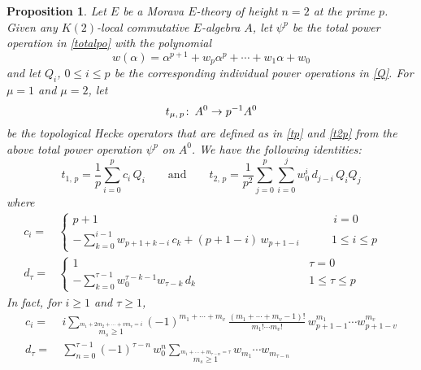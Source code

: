 \documentclass{gtpart}
\newtheorem{prop}[thm]{Proposition}
\theoremstyle{definition}
\theoremstyle{remark}
\def\co{\colon\thinspace}
\newcommand{\ad}{\text{and}}
\newcommand{\A}{\alpha}
\newcommand{\T}{\tau}
\renewcommand{\=}{\approx}
\renewcommand{\-}{\sim}
\numberwithin{equation}{section}
\numberwithin{thm}{section}
\begin{document}
\begin{prop}
 \label{prop:Q}
 Let $E$ be a Morava $E$-theory of height $n = 2$ at the prime $p$.  Given any 
 $K(2)$-local commutative $E$-algebra $A$, let $\psi^p$ be the total power 
 operation in \eqref{totalpo} with the polynomial 
 \begin{equation}
  \label{wi}
  w(\A) = \A^{p + 1} + w_p \A^p + \cdots + w_1 \A + w_0 
 \end{equation}
 and let $Q_i$, $0 \leq i \leq p$ be the corresponding individual power 
 operations in \eqref{Q}.  For $\mu = 1$ and $\mu = 2$, let 
 \[
  t_{\mu,\,p} \co A^0 \to p^{-1} A^0 
 \]
 be the topological Hecke operators that are defined as in \eqref{tp} and 
 \eqref{t2p} from the above total power operation $\psi^p$ on $A^0$.  We have 
 the following identities: 
 \[
  t_{1,\,p} = \frac{1}{p} \sum_{i = 0}^p c_i \, Q_i \qquad \ad \qquad t_{2,\,p} 
  = \frac{1}{p^2} \sum_{j = 0}^p \sum_{i = 0}^j w_0^i \, d_{j - i} \, Q_i Q_j 
 \]
 where 
 \begin{equation*}
  \begin{split}
   c_i = & \left\{\!\!
   \begin{array}{ll}
    p + 1 & \qquad\, i = 0 \\
    -\sum_{k = 0}^{i - 1} w_{p + 1 + k - i} \, c_k + (p + 1 - i) \, 
    w_{p + 1 - i} & \qquad 1 \leq i \leq p 
   \end{array}
   \right.\\
   d_\T = & \left\{\!\!
   \begin{array}{ll}
    1 & \qquad\qquad\qquad\qquad\quad\, \T = 0 \\
    -\sum_{k = 0}^{\T - 1} w_0^{\T - k - 1} w_{\T - k} \, d_k & 
    \qquad\qquad\qquad\qquad\quad\, 1 \leq \T \leq p 
   \end{array}
   \right.\qquad\quad~\,
  \end{split}
 \end{equation*}
 In fact, for $i \geq 1$ and $\T \geq 1$, 
 \begin{equation*}
  \begin{split}
    c_i = & ~ i \sum_{\stackrel{\scriptstyle m_1 + 2 m_2 + \cdots + v m_v = i}
            {m_s \geq 1}} (-1)^{m_1 + \cdots + m_v} \, 
            \frac{(m_1 + \cdots + m_v - 1)!}{m_1! \cdots m_v!} \, 
            w_{p + 1 - 1}^{m_1} \cdots w_{p + 1 - v}^{m_v} \\
   d_\T = & ~ \sum_{n = 0}^{\T - 1} (-1)^{\T - n} \, w_0^n 
            \sum_{\stackrel{\scriptstyle m_1 + \cdots + m_{\T - n} = \T}
            {m_s \geq 1}} w_{m_1} \cdots w_{m_{\T - n}} 
  \end{split}
 \end{equation*}
\end{prop}
\end{document}
